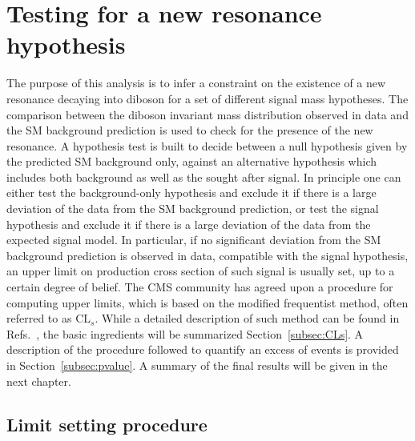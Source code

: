 \section{Testing for a new resonance hypothesis}\label{sec:stat}

The purpose of this analysis is to infer a constraint on the existence of a new resonance decaying into diboson for a set of different signal mass hypotheses.
The comparison between the diboson invariant mass distribution observed in data and the SM background prediction is used to check for the presence of the new resonance.
A hypothesis test is built to decide between a null hypothesis given by the predicted SM background only, against an alternative hypothesis which includes both background as well as the sought after signal.
In principle one can either test the background-only hypothesis and exclude it if there is a large deviation of the data from the SM background prediction,
or test the signal hypothesis and exclude it if there is a large deviation of the data from the expected signal model.
In particular, if no significant deviation from the SM background prediction is observed in data, compatible with the signal hypothesis, an upper limit on 
production cross section of such signal is usually set, up to a certain degree of belief.
The CMS community has agreed upon a procedure for computing upper limits, which is based on the modified frequentist method, often referred to as $\mathrm{CL}_s$.
While a detailed description of such method can be found in Refs.~\cite{CLs1,Junk:1999kv}, the basic ingredients will be summarized Section~\ref{subsec:CLs}.
A description of the procedure followed to quantify an excess of events is provided in Section~\ref{subsec:pvalue}. A summary of the final results will be given in the next chapter.

\subsection{Limit setting procedure}~\label{subsec:CLs}

